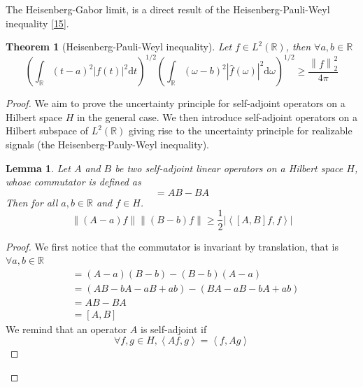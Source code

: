 \documentclass[
  american,
]{article}
\newtheorem{theorem}{Theorem}
\newtheorem{lemma}{Lemma}
\begin{document}
The Heisenberg-Gabor limit, is a direct result
of the Heisenberg-Pauli-Weyl inequality {[}\protect\hyperlink{ref-grochenig2001}{15}{]}.

\begin{theorem}[Heisenberg-Pauli-Weyl inequality]
Let \(f\in L^2(\mathbb{R})\), then \(\forall a,b\in\mathbb{R}\)
\begin{equation}
\left(\int_\mathbb{R}(t-a)^2\left\lvert f(t)\right\rvert^2\mathrm{d}t\right)^{1/2}
\left(\int_\mathbb{R}(\omega-b)^2\left\lvert\hat f(\omega)\right\rvert^2\mathrm{d}\omega\right)^{1/2}
\geq \frac{\left\lVert f\right\rVert_2^2}{4\pi}
\end{equation}
\end{theorem}

\begin{proof}
We aim to prove the uncertainty principle for self-adjoint operators
on a Hilbert space \(H\) in the general case.
We then introduce self-adjoint operators on a Hilbert subspace of \(L^2(\mathbb{R})\)
giving rise to the uncertainty principle for realizable signals
(the Heisenberg-Pauly-Weyl inequality).

\begin{lemma}
Let \(A\) and \(B\) be two self-adjoint linear operators
on a Hilbert space \(H\), whose commutator is defined as
\begin{equation}
[A,B]=AB-BA
\end{equation}
Then for all \(a,b\in\mathbb{R}\) and \(f\in H\).
\begin{equation}
\left\lVert(A-a)f\right\rVert\left\lVert(B-b)f\right\rVert\geq \frac{1}{2}\left\lvert\left\langle[A,B]f,f\right\rangle\right\rvert
\end{equation}
\end{lemma}

\begin{proof}
We first notice that the commutator is invariant by translation, that is \(\forall a,b\in\mathbb{R}\)
\begin{align*}
[A-a,B-b] &= (A-a)(B-b) - (B-b)(A-a)\\
    &= (AB-bA-aB+ab) - (BA-aB-bA+ab)\\
    &= AB - BA\\
    &= [A,B]
\end{align*}
We remind that an operator \(A\) is self-adjoint if
\begin{equation}
\forall f,g\in H, \left\langle Af,g\right\rangle = \left\langle f,Ag\right\rangle
\end{equation}


\end{proof}
\end{proof}
\end{document}
